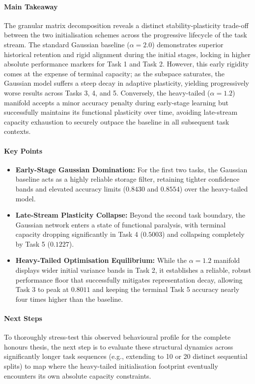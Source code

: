 \documentclass[10pt,a4paper]{article}
\begin{document}
	\paragraph{Main Takeaway}
	The granular matrix decomposition reveals a distinct stability-plasticity trade-off between the two initialisation schemes across the progressive lifecycle of the task stream. The standard Gaussian baseline ($\alpha=2.0$) demonstrates superior historical retention and rigid alignment during the initial stages, locking in higher absolute performance markers for Task 1 and Task 2. However, this early rigidity comes at the expense of terminal capacity; as the subspace saturates, the Gaussian model suffers a steep decay in adaptive plasticity, yielding progressively worse results across Tasks 3, 4, and 5. Conversely, the heavy-tailed ($\alpha=1.2$) manifold accepts a minor accuracy penalty during early-stage learning but successfully maintains its functional plasticity over time, avoiding late-stream capacity exhaustion to securely outpace the baseline in all subsequent task contexts.
	
	\paragraph{Key Points}
	\begin{itemize}
		\item \textbf{Early-Stage Gaussian Domination:} For the first two tasks, the Gaussian baseline acts as a highly reliable storage filter, retaining tighter confidence bands and elevated accuracy limits ($0.8430$ and $0.8554$) over the heavy-tailed model.
		\item \textbf{Late-Stream Plasticity Collapse:} Beyond the second task boundary, the Gaussian network enters a state of functional paralysis, with terminal capacity dropping significantly in Task 4 ($0.5003$) and collapsing completely by Task 5 ($0.1227$).
		\item \textbf{Heavy-Tailed Optimisation Equilibrium:} While the $\alpha=1.2$ manifold displays wider initial variance bands in Task 2, it establishes a reliable, robust performance floor that successfully mitigates representation decay, allowing Task 3 to peak at $0.8011$ and keeping the terminal Task 5 accuracy nearly four times higher than the baseline.
	\end{itemize}
	
	\paragraph{Next Steps}
	To thoroughly stress-test this observed behavioural profile for the complete honours thesis, the next step is to evaluate these structural dynamics across significantly longer task sequences (e.g., extending to 10 or 20 distinct sequential splits) to map where the heavy-tailed initialisation footprint eventually encounters its own absolute capacity constraints.
\end{document}
